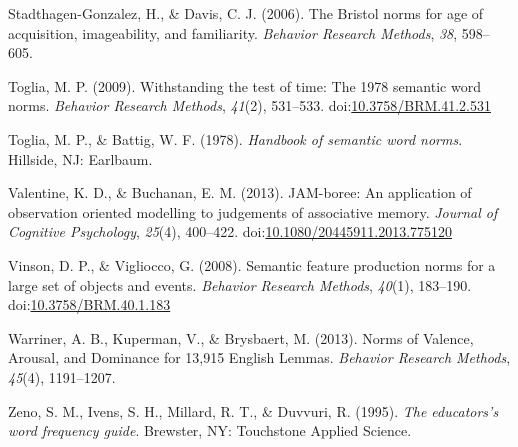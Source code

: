 \documentclass[english,man]{apa6}
\theoremstyle{definition}
\theoremstyle{definition}
\theoremstyle{definition}
\theoremstyle{remark}
\begin{document}
\hypertarget{ref-Stadthagen-Gonzalez2006}{}
Stadthagen-Gonzalez, H., \& Davis, C. J. (2006). The Bristol norms for
age of acquisition, imageability, and familiarity. \emph{Behavior
Research Methods}, \emph{38}, 598--605.

\hypertarget{ref-Toglia2009}{}
Toglia, M. P. (2009). Withstanding the test of time: The 1978 semantic
word norms. \emph{Behavior Research Methods}, \emph{41}(2), 531--533.
doi:\href{https://doi.org/10.3758/BRM.41.2.531}{10.3758/BRM.41.2.531}

\hypertarget{ref-Toglia1978}{}
Toglia, M. P., \& Battig, W. F. (1978). \emph{Handbook of semantic word
norms}. Hillside, NJ: Earlbaum.

\hypertarget{ref-Valentine2013}{}
Valentine, K. D., \& Buchanan, E. M. (2013). JAM-boree: An application
of observation oriented modelling to judgements of associative memory.
\emph{Journal of Cognitive Psychology}, \emph{25}(4), 400--422.
doi:\href{https://doi.org/10.1080/20445911.2013.775120}{10.1080/20445911.2013.775120}

\hypertarget{ref-Vinson2008}{}
Vinson, D. P., \& Vigliocco, G. (2008). Semantic feature production
norms for a large set of objects and events. \emph{Behavior Research
Methods}, \emph{40}(1), 183--190.
doi:\href{https://doi.org/10.3758/BRM.40.1.183}{10.3758/BRM.40.1.183}

\hypertarget{ref-Warriner2013}{}
Warriner, A. B., Kuperman, V., \& Brysbaert, M. (2013). Norms of
Valence, Arousal, and Dominance for 13,915 English Lemmas.
\emph{Behavior Research Methods}, \emph{45}(4), 1191--1207.

\hypertarget{ref-Zeno1995}{}
Zeno, S. M., Ivens, S. H., Millard, R. T., \& Duvvuri, R. (1995).
\emph{The educators's word frequency guide}. Brewster, NY: Touchstone
Applied Science.
\end{document}
